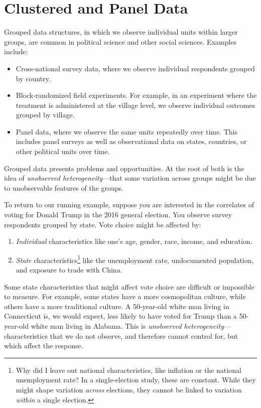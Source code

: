 \documentclass[12pt,oneside,openany]{book}
\let\rmarkdownfootnote\footnote%
\def\footnote{\protect\rmarkdownfootnote}
\begin{document}
\chapter{Clustered and Panel Data}\label{panel}

Grouped data structures, in which we observe individual units within
larger groups, are common in political science and other social
sciences. Examples include:

\begin{itemize}
\item
  Cross-national survey data, where we observe individual respondents
  grouped by country.
\item
  Block-randomized field experiments. For example, in an experiment
  where the treatment is administered at the village level, we observe
  individual outcomes grouped by village.
\item
  Panel data, where we observe the same units repeatedly over time. This
  includes panel surveys as well as observational data on states,
  countries, or other political units over time.
\end{itemize}

Grouped data presents problems and opportunities. At the root of both is
the idea of \emph{unobserved heterogeneity}---that some variation across
groups might be due to unobservable features of the groups.

To return to our running example, suppose you are interested in the
correlates of voting for Donald Trump in the 2016 general election. You
observe survey respondents grouped by state. Vote choice might be
affected by:

\begin{enumerate}
\def\labelenumi{\arabic{enumi}.}
\item
  \emph{Individual} characteristics like one's age, gender, race,
  income, and education.
\item
  \emph{State} characteristics\footnote{Why did I leave out national
    characteristics, like inflation or the national unemployment rate?
    In a single-election study, these are constant. While they might
    shape variation \emph{across} elections, they cannot be linked to
    variation \emph{within} a single election.} like the unemployment
  rate, undocumented population, and exposure to trade with China.
\end{enumerate}

Some state characteristics that might affect vote choice are difficult
or impossible to measure. For example, some states have a more
cosmopolitan culture, while others have a more traditional culture. A
50-year-old white man living in Connecticut is, we would expect, less
likely to have voted for Trump than a 50-year-old white man living in
Alabama. This is \emph{unobserved heterogeneity}---characteristics that
we do not observe, and therefore cannot control for, but which affect
the response.
\end{document}
